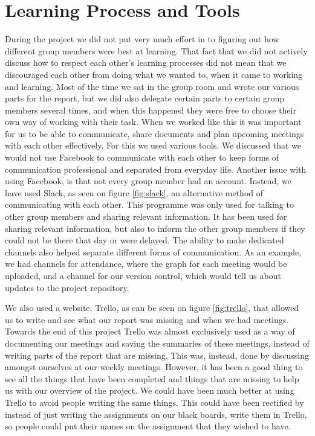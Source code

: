 \section{Learning Process and Tools}
During the project we did not put very much effort in to figuring out how different group members were best at learning.
That fact that we did not actively discuss how to respect each other's learning processes did not mean that we discouraged each other from doing what we wanted to, when it came to working and learning.
Most of the time we sat in the group room and wrote our various parts for the report, but we did also delegate certain parts to certain group members several times, and when this happened they were free to choose their own way of working with their task.
When we worked like this it was important for us to be able to communicate, share documents and plan upcoming meetings with each other effectively.
For this we used various tools.
We discussed that we would not use Facebook to communicate with each other to keep forms of communication professional and separated from everyday life.
Another issue with using Facebook, is that not every group member had an account.
Instead, we have used Slack, as seen on figure \ref{fig:slack}, an alternative method of communicating with each other. 
This programme was only used for talking to other group members and sharing relevant information. 
It has been used for sharing relevant information, but also to inform the other group members if they could not be there that day or were delayed. 
The ability to make dedicated channels also helped separate different forms of communication.
As an example, we had channels for attendance, where the graph for each meeting would be uploaded, and a channel for our version control, which would tell us about updates to the project repository.

We also used a website, Trello, as can be seen on figure \ref{fig:trello}, that allowed us to write and see what our report was missing and when we had meetings. 
Towards the end of this project Trello was almost exclusively used as a way of documenting our meetings and saving the summaries of these meetings, instead of writing parts of the report that are missing. 
This was, instead, done by discussing amongst ourselves at our weekly meetings.
However, it has been a good thing to see all the things that have been completed and things that are missing to help us with our overview of the project.
We could have been much better at using Trello to avoid people writing the same things.
This could have been rectified by instead of just writing the assignments on our black boards, write them in Trello, so people could put their names on the assignment that they wished to have.


